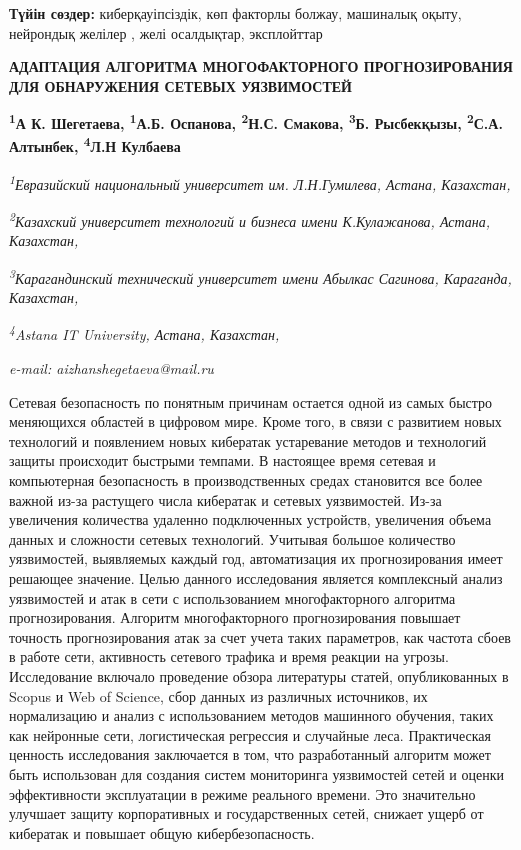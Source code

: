 {\bfseries Түйін сөздер:} киберқауіпсіздік, көп факторлы болжау, машиналық
оқыту, нейрондық желілер , желі осалдықтар, эксплойттар

\begin{articleheader}
{\bfseries АДАПТАЦИЯ АЛГОРИТМА МНОГОФАКТОРНОГО ПРОГНОЗИРОВАНИЯ ДЛЯ ОБНАРУЖЕНИЯ СЕТЕВЫХ УЯЗВИМОСТЕЙ}

{\bfseries
\textsuperscript{1}А К. Шегетаева\textsuperscript{\envelope },
\textsuperscript{1}А.Б. Оспанова,
\textsuperscript{2}Н.С. Смакова,
\textsuperscript{3}Б. Рысбекқызы,
\textsuperscript{2}С.А. Алтынбек,
\textsuperscript{4}Л.Н Кулбаева}
\end{articleheader}

\begin{affiliation}
\emph{\textsuperscript{1}Евразийский национальный университет им. Л.Н.Гумилева, Астана, Казахстан,}

\emph{\textsuperscript{2}Казахский университет технологий и бизнеса имени К.Кулажанова, Астана, Казахстан,}

\emph{\textsuperscript{3}Карагандинский технический университет имени Абылкас Сагинова, Караганда, Казахстан,}

\emph{\textsuperscript{4}Astana IT University, Астана, Казахстан,}

\emph{e-mail: aizhanshegetaeva@mail.ru}
\end{affiliation}

Сетевая безопасность по понятным причинам остается одной из самых быстро
меняющихся областей в цифровом мире. Кроме того, в связи с развитием
новых технологий и появлением новых кибератак устаревание методов и
технологий защиты происходит быстрыми темпами. В настоящее время сетевая
и компьютерная безопасность в производственных средах становится все
более важной из-за растущего числа кибератак и сетевых уязвимостей.
Из-за увеличения количества удаленно подключенных устройств, увеличения
объема данных и сложности сетевых технологий. Учитывая большое
количество уязвимостей, выявляемых каждый год, автоматизация их
прогнозирования имеет решающее значение. Целью данного исследования
является комплексный анализ уязвимостей и атак в сети с использованием
многофакторного алгоритма прогнозирования. Алгоритм многофакторного
прогнозирования повышает точность прогнозирования атак за счет учета
таких параметров, как частота сбоев в работе сети, активность сетевого
трафика и время реакции на угрозы. Исследование включало проведение
обзора литературы статей, опубликованных в Scopus и Web of Science, сбор
данных из различных источников, их нормализацию и анализ с
использованием методов машинного обучения, таких как нейронные сети,
логистическая регрессия и случайные леса. Практическая ценность
исследования заключается в том, что разработанный алгоритм может быть
использован для создания систем мониторинга уязвимостей сетей и оценки
эффективности эксплуатации в режиме реального времени. Это значительно
улучшает защиту корпоративных и государственных сетей, снижает ущерб от
кибератак и повышает общую кибербезопасность.


